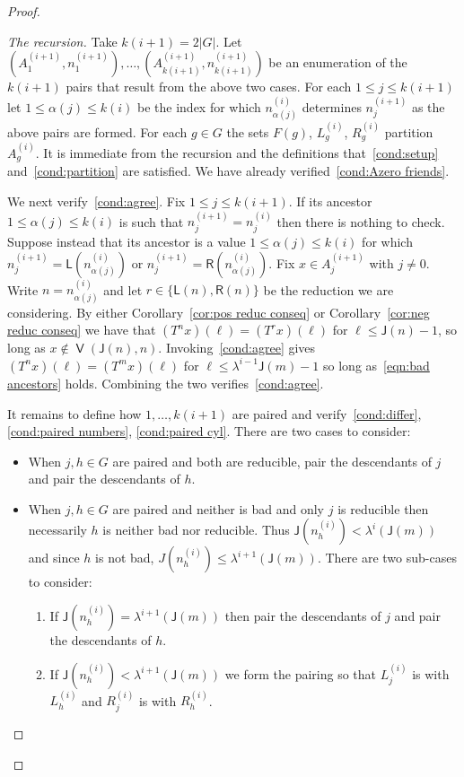 \documentclass[AHL,Unicode,longabstracts,published]{cedram}
\DeclareMathOperator{\bad}{\mathsf{V}}
\newcommand{\lft}{\mathsf{L}}
\newcommand{\rht}{\mathsf{R}}
\newcommand{\scl}{\mathsf{J}}
\begin{document}
\begin{proof}
\begin{proof}[{The recursion}]
Take $k(i+1) = 2|G|$. Let $(A^{(i+1)}_1, n^{(i+1)}_1),\dots,(A^{(i+1)}_{k(i+1)}, n^{(i+1)}_{k(i+1)})$ be an enumeration of the $k(i+1)$ pairs that result from the above two cases. For each $1 \le j \le k(i+1)$ let $1 \le \alpha(j) \le k(i)$ be the index for which $n^{(i)}_{\alpha(j)}$ determines $n^{(i+1)}_j$ as the above pairs are formed. For each $g \in G$ the sets $F(g)$, $L^{(i)}_g$, $R^{(i)}_g$ partition $A^{(i)}_g$. It is immediate from the recursion and the definitions that~\eqref{cond:setup} and~\eqref{cond:partition} are satisfied. We have already verified~\eqref{cond:Azero friends}.

We next verify~\eqref{cond:agree}. Fix $1 \le j \le k(i+1)$. If its ancestor $1
\le \alpha(j) \le k(i)$ is such that $n^{(i+1)}_j = n^{(i)}_j$ then there is nothing to check. Suppose instead that its ancestor is a value $1 \le
\alpha(j) \le k(i)$ for which $n^{(i+1)}_j = \lft(n^{(i)}_{\alpha(j)})$ or $n^{(i+1)}_j = \rht(n^{(i)}_{\alpha(j)})$. Fix $x \in A^{(i+1)}_j$ with $j
\ne 0$. Write $n = n_{\alpha(j)}^{(i)}$ and let $r \in \{\lft(n),\rht(n)\}$ be the reduction we are considering. By either Corollary~\ref{cor:pos reduc conseq} or Corollary~\ref{cor:neg reduc conseq} we have that $(T^n x)(\ell) = (T^r x)(\ell)$ for $\ell \leq\scl(n)-1$, so long as $x \notin
\bad(\scl(n),n)$. Invoking~\eqref{cond:agree} gives $(T^n x)(\ell) = (T^m x)(\ell)$ for $\ell\leq \lambda^{i-1}\scl(m)-1$ so long as~\eqref{eqn:bad ancestors} holds. Combining the two verifies~\eqref{cond:agree}.


It remains to define how $1,\dots,k(i+1)$ are paired and verify~\eqref{cond:differ}, \eqref{cond:paired numbers}, \eqref{cond:paired cyl}. There are two cases to consider:
\begin{itemize}
\item When $j,h \in G$ are paired and both are reducible, pair the descendants of $j$ and pair the descendants of $h$.
\item When $j,h \in G$ are paired and neither is bad and only $j$ is reducible then necessarily $h$ is neither bad nor reducible. Thus $\scl(n^{(i)}_h) < \lambda^i(\scl(m))$ and since $h$ is not bad, $J(n^{(i)}_h)\leq \lambda^{i+1}(\scl(m))$. There are two sub-cases to consider:
\begin{enumerate}
\item\label{subcase1} If $\scl(n_h^{(i)}) = \lambda^{i+1}(\scl(m))$ then pair the descendants of $j$ and pair the descendants of $h$.
\item\label{subcase2} If $\scl(n_h^{(i)}) < \lambda^{i+1}(\scl(m))$ we form the pairing so that $L^{(i)}_j$ is with $L^{(i)}_h$ and $R^{(i)}_j$ is with $R^{(i)}_h$.
\end{enumerate}
\end{itemize}


\end{proof}
\end{proof}
\end{document}
